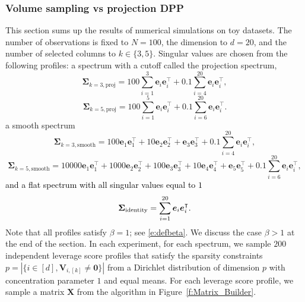 \documentclass[twoside,11pt]{book}
\newcommand{\rev}[1]{\textcolor{black}{#1}}
\numberwithin{theorem}{chapter}
\numberwithin{definition}{chapter}
\numberwithin{proposition}{chapter}
\numberwithin{corollary}{chapter}
\numberwithin{example}{chapter}
\numberwithin{lemma}{chapter}
\numberwithin{assumption}{chapter}
\numberwithin{equation}{chapter}
\numberwithin{figure}{chapter}
\DeclareMathOperator{\Tran}{\intercal}
\begin{document}
\subsubsection{Volume sampling vs projection DPP}
This section sums up the results of numerical simulations on toy datasets. The number of observations is fixed to $N =100 $, the dimension to $d = 20$, and the number of selected columns to $k \in \{3,5\}$. Singular values are chosen from the following profiles: a spectrum with a cutoff called the projection spectrum,
$$
	\bm{\Sigma}_{k=3,\text{proj}} = 100 \sum\limits_{i = 1}^{3} \bm{e}_{i}\bm{e}_{i}^{\Tran} + 0.1 \sum\limits_{i = 4}^{20} \bm{e}_{i}\bm{e}_{i}^{\Tran}, $$
$$
	\bm{\Sigma}_{k=5,\text{proj}} = 100 \sum\limits_{i = 1}^{5} \bm{e}_{i}\bm{e}_{i}^{\Tran} + 0.1 \sum\limits_{i = 6}^{20} \bm{e}_{i}\bm{e}_{i}^{\Tran}. $$
a smooth spectrum
$$
	\bm{\Sigma}_{k=3,\text{smooth}} = 100\bm{e}_{1}\bm{e}_{1}^{\Tran} + 10\bm{e}_{2}\bm{e}_{2}^{\Tran} + \bm{e}_{3}\bm{e}_{3}^{\Tran} + 0.1 \sum\limits_{i = 4}^{20} \bm{e}_{i}\bm{e}_{i}^{\Tran},$$
$$
	\bm{\Sigma}_{k=5,\text{smooth}} = 10000\bm{e}_{1}\bm{e}_{1}^{\Tran} + 1000\bm{e}_{2}\bm{e}_{2}^{\Tran} + 100\bm{e}_{3}\bm{e}_{3}^{\Tran} +  10\bm{e}_{4}\bm{e}_{4}^{\Tran} +  \bm{e}_{5}\bm{e}_{5}^{\Tran} + 0.1 \sum\limits_{i = 6}^{20} \bm{e}_{i}\bm{e}_{i}^{\Tran},
	$$
\rev{and a flat spectrum with all singular values equal to $1$}
$$
\rev{    \bm{\Sigma}_{\text{identity}} = \sum\limits_{i = 1}^{20} \bm{e}_{i}\bm{e}_{i}^{\Tran}.}
    $$
Note that all profiles satisfy $\beta=1$; see \eqref{e:defbeta}. We discuss the case $\beta > 1$ at the end of the section. In each experiment, for each spectrum, we sample $200$ independent leverage score profiles that satisfy the sparsity constraints $p = \left| \{i \in [d], \bm{V}_{i,[k]} \neq \bm{0}\}\right|$ from a Dirichlet distribution of dimension $p$ with concentration parameter $1$ and equal means. For each leverage score profile, we sample a matrix $\bm{X}$ from the algorithm in Figure~\ref{f:Matrix_Builder}.
\end{document}
